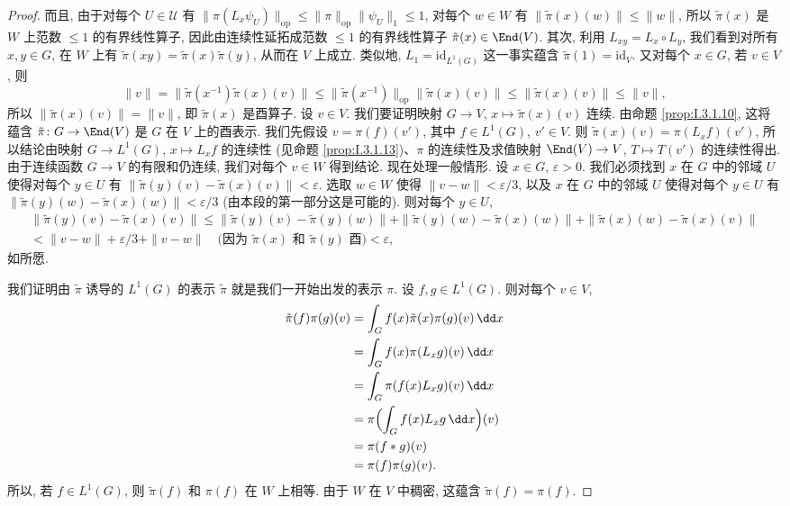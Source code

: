 \begin{proof}
而且, 由于对每个 $U \in \mathcal{U}$ 有 $\|\pi(L_x\psi_U)\|_{\mathrm{op}} \leq \|\pi\|_{\mathrm{op}}\|\psi_U\|_1 \leq 1$, 对每个 $w \in W$ 有 $\|\tilde{\pi}(x)(w)\| \leq \|w\|$, 所以 $\tilde{\pi}(x)$ 是 $W$ 上范数 $\leq 1$ 的有界线性算子, 因此由连续性延拓成范数 $\leq 1$ 的有界线性算子 $\tilde{\pi}(x) \in \End(V)$.
其次, 利用 $L_{xy} = L_x \circ L_y$, 我们看到对所有 $x, y \in G$, 在 $W$ 上有 $\tilde{\pi}(xy) = \tilde{\pi}(x)\tilde{\pi}(y)$, 从而在 $V$ 上成立. 类似地, $L_1 = \mathrm{id}_{L^1(G)}$ 这一事实蕴含 $\tilde{\pi}(1) = \mathrm{id}_V$. 又对每个 $x \in G$, 若 $v \in V$, 则
\[
\|v\| = \|\tilde{\pi}(x^{-1})\tilde{\pi}(x)(v)\| \leq \|\tilde{\pi}(x^{-1})\|_{\mathrm{op}}\|\tilde{\pi}(x)(v)\| \leq \|\tilde{\pi}(x)(v)\| \leq \|v\|,
\]
所以 $\|\tilde{\pi}(x)(v)\| = \|v\|$, 即 $\tilde{\pi}(x)$ 是酉算子.
设 $v \in V$. 我们要证明映射 $G \to V$, $x \longmapsto \tilde{\pi}(x)(v)$ 连续. 由命题 \ref{prop:I.3.1.10}, 这将蕴含 $\tilde{\pi} \colon G \to \End(V)$ 是 $G$ 在 $V$ 上的酉表示. 我们先假设 $v = \pi(f)(v')$, 其中 $f \in L^1(G)$, $v' \in V$. 则 $\tilde{\pi}(x)(v) = \pi(L_xf)(v')$, 所以结论由映射 $G \to L^1(G)$, $x \longmapsto L_xf$ 的连续性 (见命题 \ref{prop:I.3.1.13})、$\pi$ 的连续性及求值映射 $\End(V) \to V$, $T \longmapsto T(v')$ 的连续性得出. 由于连续函数 $G \to V$ 的有限和仍连续, 我们对每个 $v \in W$ 得到结论. 现在处理一般情形. 设 $x \in G$, $\varepsilon > 0$. 我们必须找到 $x$ 在 $G$ 中的邻域 $U$ 使得对每个 $y \in U$ 有 $\|\tilde{\pi}(y)(v) - \tilde{\pi}(x)(v)\| < \varepsilon$. 选取 $w \in W$ 使得 $\|v - w\| < \varepsilon/3$, 以及 $x$ 在 $G$ 中的邻域 $U$ 使得对每个 $y \in U$ 有 $\|\tilde{\pi}(y)(w) - \tilde{\pi}(x)(w)\| < \varepsilon/3$ (由本段的第一部分这是可能的). 则对每个 $y \in U$,
\begin{multline*}
\|\tilde{\pi}(y)(v) - \tilde{\pi}(x)(v)\| \leq \|\tilde{\pi}(y)(v) - \tilde{\pi}(y)(w)\| + \|\tilde{\pi}(y)(w) - \tilde{\pi}(x)(w)\| + \|\tilde{\pi}(x)(w) - \tilde{\pi}(x)(v)\| \\
< \|v - w\| + \varepsilon/3 + \|v - w\| \quad \text{(因为 $\tilde{\pi}(x)$ 和 $\tilde{\pi}(y)$ 酉)} < \varepsilon,
\end{multline*}
如所愿.

我们证明由 $\tilde{\pi}$ 诱导的 $L^1(G)$ 的表示 $\tilde{\pi}$ 就是我们一开始出发的表示 $\pi$. 设 $f, g \in L^1(G)$. 则对每个 $v \in V$,
\begin{align*}
\tilde{\pi}(f)\pi(g)(v) &= \int_G f(x)\tilde{\pi}(x)\pi(g)(v)\,\dd x \\
&= \int_G f(x)\pi(L_xg)(v)\,\dd x \\
&= \int_G \pi(f(x)L_xg)(v)\,\dd x \\
&= \pi\Bigl(\int_G f(x)L_xg\,\dd x\Bigr)(v) \\
&= \pi(f * g)(v) \\
&= \pi(f)\pi(g)(v).
\end{align*}
所以, 若 $f \in L^1(G)$, 则 $\tilde{\pi}(f)$ 和 $\pi(f)$ 在 $W$ 上相等. 由于 $W$ 在 $V$ 中稠密, 这蕴含 $\tilde{\pi}(f) = \pi(f)$.


\end{proof}
